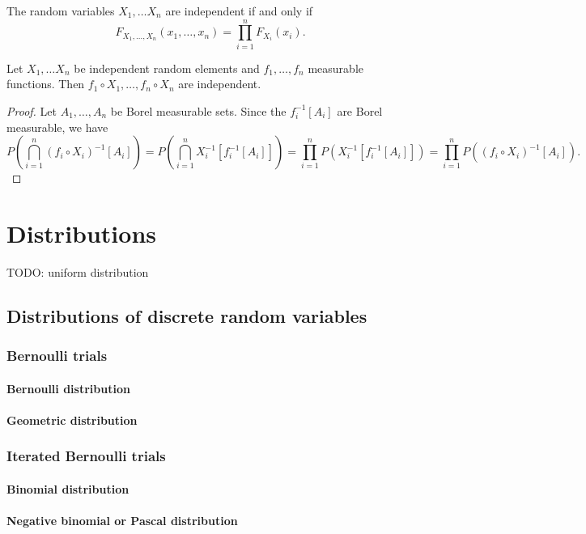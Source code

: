 \begin{proposition}
The random variables $X_1, \ldots X_n$ are independent \textup{if and only if}
\[ F_{X_1,\ldots, X_n}(x_1, \ldots, x_n) = \prod_{i=1}^n F_{X_i}(x_i). \]
\end{proposition}

\begin{proposition}
Let $X_1, \ldots X_n$ be independent random elements and $f_1, \ldots, f_n$ measurable functions. Then $f_1\circ X_1, \ldots, f_n\circ X_n$ are independent.
\end{proposition}
\begin{proof}
Let $A_1, \ldots, A_n$ be Borel measurable sets. Since the $f_i^{-1}[A_i]$ are Borel measurable, we have
\[ P\left(\bigcap_{i=1}^n (f_i\circ X_i)^{-1}[A_i]\right) = P\left(\bigcap_{i=1}^n X_i^{-1}[f^{-1}_i[A_i]]\right) = \prod_{i=1}^n P(X_i^{-1}[f^{-1}_i[A_i]]) = \prod_{i=1}^n P((f_i\circ X_i)^{-1}[A_i]). \]
\end{proof}

\chapter{Distributions}
TODO: uniform distribution

\section{Distributions of discrete random variables}
\subsection{Bernoulli trials}
\subsubsection{Bernoulli distribution}
\subsubsection{Geometric distribution}

\subsection{Iterated Bernoulli trials}
\subsubsection{Binomial distribution}
\subsubsection{Negative binomial or Pascal distribution}
